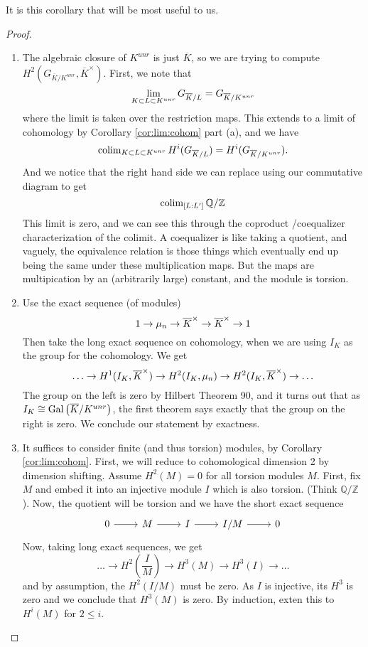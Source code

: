 It is this corollary that will be most useful to us.

\begin{proof}
	\begin{enumerate}[(1)]
		\item The algebraic closure of \(K^{unr}\) is just \(\overline{K}\),
			so we are trying to compute 
			\(H^{2}(G_{\overline{K} / K^{unr}},\overline{K}^{\times})\).
			First, we note that
			 \[
			 \lim_{K \subset L \subset K^{unr}} G_{\overline{K} / L} 
			 = G_{\overline{K} / K^{unr}}
			 \] 
			where the limit is taken over the restriction maps.
			This extends to a limit of cohomology by 
			Corollary \ref{cor:lim:cohom} part (a), and
			we have
			\[
				\operatorname{colim}_{K \subset L \subset K^{unr}} H^{i}(G_{\overline{K} / L}) 
				= H^{i}(G_{\overline{K} / K^{unr}})
			.\] 
			And we notice that the right hand side we can replace using
			our commutative diagram to get
			\[
				\operatorname{colim}_{[L:L^{\prime}]} \mathbb{Q} / \mathbb{Z}
			\] 
			This limit is zero, and we can see this through the coproduct
			/coequalizer characterization of the colimit. 
			A coequalizer is like taking a quotient, and vaguely, the 
			equivalence relation is those things which eventually end up being
			the same under these multiplication maps. 
			But the maps are multipication by an (arbitrarily large) constant,
			and the module is torsion.
		\item Use the exact sequence (of modules) 
			\[
			1 \to \mu_{n} \to \overline{K}^{\times} \to \overline{K}^{\times}
			\to 1
			\] 
			Then take the long exact sequence on cohomology, when we are using
			\(I_{K}\) as the group for the cohomology.
			We get 
			\[
				\ldots \to H^{1}(I_{K},\overline{K}^{\times}) \to
				H^{2}(I_{K}, \mu_{n}) \to H^{2}(I_{K},\overline{K}^{\times})
				\to \ldots
			\] 
			The group on the left is zero by Hilbert Theorem 90, and
			it turns out that as \(I_{K} \cong \operatorname{Gal}\left( 
			\overline{K} / K^{unr} \right)\), the first theorem 
			says exactly that the group on the right is zero. 
			We conclude our statement by exactness.
			
		\item 
			It suffices to consider
			finite (and thus torsion) modules, by Corollary \ref{cor:lim:cohom}.
			First, we will reduce to cohomological dimension 2 by dimension
			shifting. 
			Assume \(H^{2}(M) = 0\) for all torsion modules \(M\).
			First, fix \(M\) and embed it into an injective module \(I\) 
			which is also torsion.
			(Think \(\mathbb{Q} / \mathbb{Z}\)).
			Now, the quotient will be torsion and we have the short exact sequence
			\[
			\begin{tikzcd}
			0 \arrow{r}{} & M \arrow{r}{} & 
			I \arrow{r}{} & I / M \arrow{r}{} & 0
			\end{tikzcd}
			\]
			Now, taking long exact sequences, we get
			\[
				\ldots \to H^{2}(\frac{I}{M}) \to 
				H^{3}(M) \to H^{3}(I) \to \ldots
			\] 
			and by assumption, the \(H^{2}(I / M)\) must be zero.
			As \(I\) is injective, its \(H^{3}\) is zero and we conclude
			that \(H^{3}(M)\) is zero. 
			By induction, exten this to \(H^{i}(M)\) for \(2 \leq i\).


\end{enumerate}
\end{proof}
